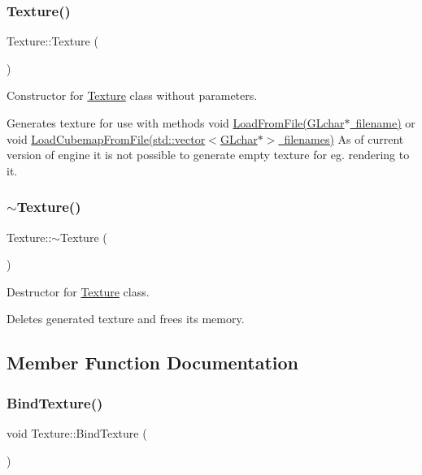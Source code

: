 \subsubsection{\texorpdfstring{Texture()}{Texture()}}
{\footnotesize\ttfamily Texture\+::\+Texture (\begin{DoxyParamCaption}{ }\end{DoxyParamCaption})}



Constructor for \mbox{\hyperlink{class_texture}{Texture}} class without parameters. 

Generates texture for use with methods void \mbox{\hyperlink{class_texture_a26134f37b4a22ff895686533937ba218}{Load\+From\+File(\+G\+Lchar$\ast$ filename)}} or void \mbox{\hyperlink{class_texture_a056053b6bb3b6ed3bb44a624f0fb62c7}{Load\+Cubemap\+From\+File(std\+::vector$<$\+G\+Lchar$\ast$$>$ filenames)}} As of current version of engine it is not possible to generate empty texture for eg. rendering to it. \mbox{\label{class_texture_a09c4bcb7462f64c1d20fa69dba3cee8a}} 
\subsubsection{\texorpdfstring{$\sim$Texture()}{~Texture()}}
{\footnotesize\ttfamily Texture\+::$\sim$\+Texture (\begin{DoxyParamCaption}{ }\end{DoxyParamCaption})}



Destructor for \mbox{\hyperlink{class_texture}{Texture}} class. 

Deletes generated texture and frees it\textquotesingle{}s memory. 

\subsection{Member Function Documentation}
\mbox{\label{class_texture_a23465d14b76deef9cf22c14a97040f52}} 
\subsubsection{\texorpdfstring{BindTexture()}{BindTexture()}}
{\footnotesize\ttfamily void Texture\+::\+Bind\+Texture (\begin{DoxyParamCaption}{ }\end{DoxyParamCaption})}



